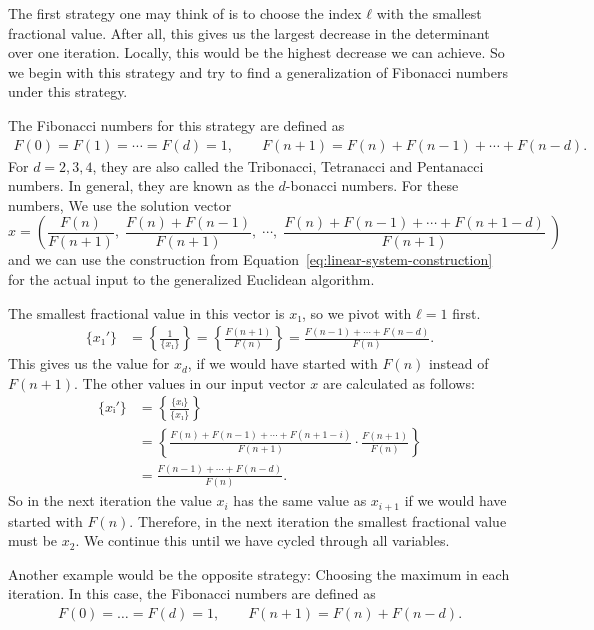 The first strategy one may think of is to choose the index $ℓ$ with the
smallest fractional value.
After all, this gives us the largest decrease in the determinant over one
iteration.
Locally, this would be the highest decrease we can achieve.
So we begin with this strategy and try to find a generalization of Fibonacci
numbers under this strategy.


The Fibonacci numbers for this strategy are defined as
\begin{align*}
  F(0) = F(1) = ⋯ = F(d) = 1, \qquad F(n + 1) = F(n) + F(n - 1) + ⋯ + F(n - d).
\end{align*}
For $d = 2, 3, 4$, they are also called the Tribonacci, Tetranacci and Pentanacci numbers.
In general, they are known as the $d$-bonacci numbers.
For these numbers,
We use the solution vector
\[
  x =
  \left(
    \frac{F(n)}{F(n + 1)},\;
    \frac{F(n) + F(n - 1)}{F(n + 1)},\;
    ⋯,\;
    \frac{F(n) + F(n - 1) + ⋯ + F(n + 1 - d)}{F(n + 1)}\;
  \right)
\]
and we can use the construction from Equation~\ref{eq:linear-system-construction}
for the actual input to the generalized Euclidean algorithm.

The smallest fractional value in this vector is $x₁$, so we pivot with $ℓ = 1$ first.
\begin{align*}
  \{x₁'\}
  & = \left\{\frac{1}{\{x₁\}}\right\}
  = \left\{\frac{F(n + 1)}{F(n)}\right\}
  = \frac{F(n - 1) + ⋯ + F(n - d)}{F(n)}.
\end{align*}
This gives us the value for $x_d$, if we would have started with $F(n)$ instead of $F(n+1)$.
The other values in our input vector $x$ are calculated as follows:
\begin{align*}
  \{xᵢ'\}
  & = \left\{\frac{\{xᵢ\}}{\{x₁\}}\right\} \\
  & = \left\{\frac{F(n) + F(n - 1) + ⋯ + F(n + 1 - i)}{F(n + 1)} · \frac{F(n + 1)}{F(n)}\right\} \\
  & = \frac{F(n - 1) + ⋯ + F(n - d)}{F(n)}.
\end{align*}
So in the next iteration the value $x_i$ has the same value as $x_{i+1}$ if we
would have started with $F(n)$.
Therefore, in the next iteration the smallest fractional value must be $x_2$.
We continue this until we have cycled through all variables.

Another example would be the opposite strategy: Choosing the maximum in each iteration.
In this case, the Fibonacci numbers are defined as
\begin{align*}
  F(0) = \dots = F(d) = 1, \qquad F(n + 1) = F(n) + F(n - d).
\end{align*}

